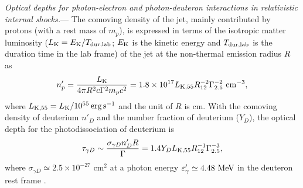\documentclass[prd,twocolumn,amsmath,amssymb,aps,linenumbers]{revtex4-2} %
\begin{document}
\textit{Optical depths for photon-electron and photon-deuteron interactions in relativistic internal shocks.}--- The comoving density of the jet, mainly contributed by protons (with a rest mass of $m_p$), is expressed in terms of the isotropic matter luminosity ($L_{\rm K}=E_{\rm K}/T_{\rm dur,lab}$; $E_{\rm K}$ is the kinetic energy and $T_{\rm dur,lab}$ is the duration time in the lab frame) of the jet at the non-thermal emission radius $R$ as%
\begin{equation}\label{eq:nbp}
 n^{\prime}_{p}=\frac{L_{\rm K}}{4\pi R^2 c \Gamma^2 m_p c^2}
     =1.8\times 10^{17} L_{\rm K,55} R_{12}^{-2}\Gamma_{2.5}^{-2} \ {\rm cm^{-3}},
\end{equation}
where $L_{\rm K,55}=L_{\rm K}/10^{55}{\,\rm erg\,s^{-1}}$ and the unit of $R$ is cm. With the comoving density of deuterium $n'_{D}$ and the number fraction of deuterium ($Y_{D}$),
the optical depth for the photodissociation of deuterium is 
\begin{equation}\label{eq:taugD}
  \tau_{\gamma D}\sim\frac{\sigma_{\gamma D} n'_ D R}{\Gamma}=1.4 Y_{D} L_{\rm K, 55} R_{12}^{-1} \Gamma_{2.5}^{-3},
\end{equation}
where $\sigma_{\gamma D}\simeq 2.5\times10^{-27}$ cm$^{2}$ at a photon energy
$\varepsilon'_\gamma \simeq 4.48~{\rm MeV}$ in the deuteron rest frame \cite{IAEA2000}. %
\end{document}
